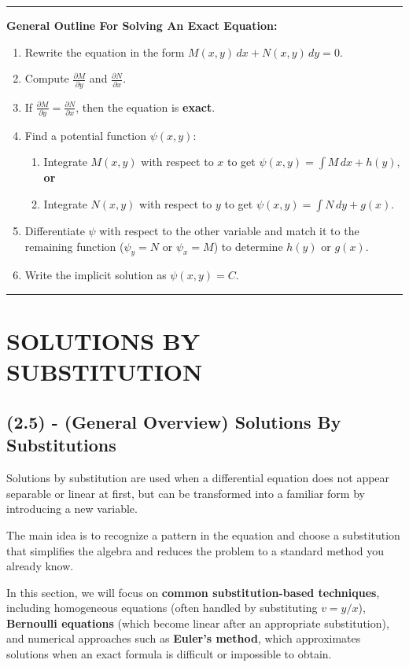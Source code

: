 \documentclass[11pt]{article}
\begin{document}
\noindent\rule{\linewidth}{0.4pt}
\textbf{General Outline For Solving An Exact Equation:}
\begin{enumerate}[topsep=2pt, itemsep=2pt, leftmargin=*]
    \item Rewrite the equation in the form $M(x,y)\,dx + N(x,y)\,dy = 0$.
    \item Compute $\frac{\partial M}{\partial y}$ and $\frac{\partial N}{\partial x}$.
    \item If $\frac{\partial M}{\partial y}=\frac{\partial N}{\partial x}$, then the equation is \textbf{exact}.
    \item Find a potential function $\psi(x,y)$:
    \begin{enumerate}[topsep=2pt, itemsep=2pt, leftmargin=*]
        \item Integrate $M(x,y)$ with respect to $x$ to get $\psi(x,y)=\int M\,dx + h(y)$, \textbf{or}
        \item Integrate $N(x,y)$ with respect to $y$ to get $\psi(x,y)=\int N\,dy + g(x)$.
    \end{enumerate}
    \item Differentiate $\psi$ with respect to the other variable and match it to the remaining function
    ($\psi_y=N$ or $\psi_x=M$) to determine $h(y)$ or $g(x)$.
    \item Write the implicit solution as $\psi(x,y)=C$.
\end{enumerate}
\noindent\rule{\linewidth}{0.4pt}


\section{SOLUTIONS BY SUBSTITUTION}
\subsection{(2.5) - (General Overview) Solutions By Substitutions}
Solutions by substitution are used when a differential equation does not appear separable or linear at first, but can be transformed into a familiar form by introducing a new variable.

The main idea is to recognize a pattern in the equation and choose a substitution that simplifies the algebra and reduces the problem to a standard method you already know.

In this section, we will focus on \textbf{common substitution-based techniques}, including homogeneous equations (often handled by substituting $v = y/x$), \textbf{Bernoulli equations} (which become linear after an appropriate substitution),
and numerical approaches such as \textbf{Euler’s method}, which approximates solutions when an exact formula is difficult or impossible to obtain.
\end{document}
